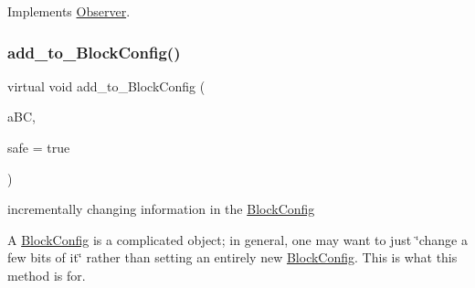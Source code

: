 Implements \mbox{\hyperlink{class_s_m_spp__di__unipi__it_1_1_observer_a4ac2234c8026ccbe13860a33fc4ef14e}{Observer}}.

\mbox{\label{class_s_m_spp__di__unipi__it_1_1_block_a938909c39570800cc7356eff74b8b7b9}} 
\subsubsection{\texorpdfstring{add\+\_\+to\+\_\+\+Block\+Config()}{add\_to\_BlockConfig()}}
{\footnotesize\ttfamily virtual void add\+\_\+to\+\_\+\+Block\+Config (\begin{DoxyParamCaption}\item[{\mbox{\hyperlink{class_s_m_spp__di__unipi__it_1_1_block_config}{Block\+Config}} $\ast$}]{a\+BC,  }\item[{const bool}]{safe = {\ttfamily true} }\end{DoxyParamCaption})\hspace{0.3cm}{\ttfamily [virtual]}}



incrementally changing information in the \mbox{\hyperlink{class_s_m_spp__di__unipi__it_1_1_block_config}{Block\+Config}} 

A \mbox{\hyperlink{class_s_m_spp__di__unipi__it_1_1_block_config}{Block\+Config}} is a complicated object; in general, one may want to just \char`\"{}change a few bits of it\char`\"{} rather than setting an entirely new \mbox{\hyperlink{class_s_m_spp__di__unipi__it_1_1_block_config}{Block\+Config}}. This is what this method is for.

